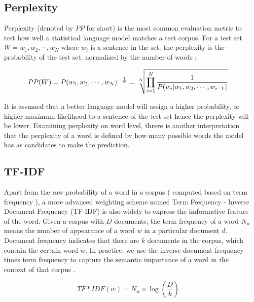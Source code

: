 
\subsection{Perplexity}
Perplexity (denoted by $PP$ for short) is the most common evaluation metric to test how well a statistical language model matches a test corpus.  For a test set $W = {w_1, w_2, \cdots, w_N}$ where $w_i$ is a sentence in the set, the perplexity is the probability of the test set, normalized by the number of words \citep{Jurafsky2008}:

\begin{equation}
PP(W) = P(w_1, w_2, \cdots, w_N)^{-\frac{1}{N}}\\
= \sqrt[N]{\prod_{i=1}^{N} \frac{1}{P(w_i|w_1, w_2,\cdots, w_{i-1})}}
\label{eq:perplexity}
\end{equation}

It is assumed that a better language model will assign a higher probability, or higher maximum likelihood to a sentence of the test set hence the perplexity will be lower. Examining perplexity on word level, threre is another interpretation that the perplexity of a word is defined by how many possible words the model has as candidates to make the prediction.

\subsection{TF-IDF}
Apart from the raw probability of a word in a corpus ( computed based on term frequency ), a more advanced weighting scheme named Term Frequency - Inverse Document Frequency (TF-IDF) is also widely to express the imformative feature of the word. Given a corpus with $D$ documents, the term frequency of a word $N_w$ means the number of appearance of a word $w$ in a particular document $d$. Document frequency indicates that there are $k$ documents in the corpus, which contain the certain word $w$. In practice, we use the inverse document frequency times term frequency to capture the semantic importance of a word in the context of that corpus \citep{Jurafsky2008}.

\begin{equation}
TF*IDF(w) = N_w \times \log(\frac{D}{k})
\label{eq:tf-idf}
\end{equation}


